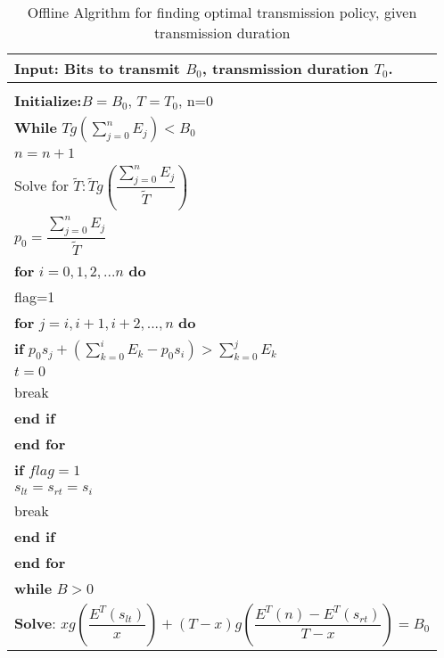 \begin{table}
\begin{minipage}[b]{8cm}
\caption{Offline Algrithm for finding optimal transmission policy, given transmission duration}
\begin{tabular}{p{7cm}}
\hline \textbf{Input}: Bits to transmit $B_0$, transmission duration $T_0$.\\
\hline
\\
\textbf{Initialize:}$B = B_0$, $T = T_0$, n=0
\\
\textbf{While} $Tg(\sum_{j=0}^n E_j) < B_0$
\\
\hspace{4mm} $n = n+1$
\\
Solve for $\tilde{T}: \tilde{T}g(\dfrac{\sum_{j=0}^n E_j}{\tilde{T}})$
\\
$p_0=\dfrac{\sum_{j=0}^n E_j}{\tilde{T}}$
\\
\textbf{for} $i=0,1,2,...n$ \textbf{do}
\\
\hspace{4mm}flag=1
\\
\hspace{4mm}\textbf{for} $j=i,i+1,i+2,...,n$ \textbf{do}
\\
\hspace{7mm}\textbf{if} $p_0s_j + (\sum_{k=0}^i E_k - p_0s_i) > \sum_{k=0}^j E_k$
\\
\hspace{10mm}$t=0$
\\
\hspace{10mm}break
\\
\hspace{7mm}\textbf{end if}
\\
\hspace{4mm}\textbf{end for}
\\
\hspace{4mm}\textbf{if} $flag=1$
\\
\hspace{7mm}$s_{lt} = s_{rt} = s_i$
\\
\hspace{7mm}break
\\
\hspace{4mm}\textbf{end if}
\\
\textbf{end for}
\\
\textbf{while} $B>0$
\\
\hspace{4mm}\textbf{Solve}: $xg(\dfrac{E^T(s_{lt})}{x})+(T-x)g(\dfrac{E^T(n)-E^T(s_{rt})}{T-x}) = B_0$
\\

\end{tabular}
\end{minipage}
\end{table}
